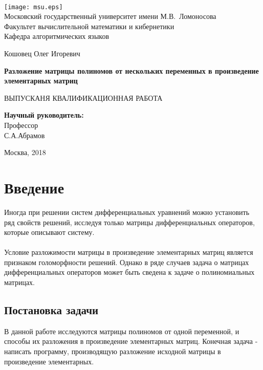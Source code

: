 \documentclass[14pt, a4paper]{extreport}
\begin{document}
\thispagestyle{empty}

\begin{center}
	\ \vspace{-3cm}

	\texttt{[image: msu.eps]}\\
	{Московский государственный университет имени М.В.~Ломоносова}\\
	Факультет вычислительной математики и кибернетики\\
	Кафедра алгоритмических языков

	\vspace{5cm}

	{\Large Кошовец Олег Игоревич}

	\vspace{1cm}

	{\Large\bfseries
	Разложение матрицы полиномов от нескольких переменных в произведение элементарных матриц\\}

	\vspace{1cm}

	{\large ВЫПУСКАНЯ КВАЛИФИКАЦИОННАЯ РАБОТА}
\end{center}

\vfill

\begin{flushright}
	\textbf{Научный руководитель:}\\
	Профессор\\
	С.А.Абрамов
\end{flushright}

\vfill


\begin{center}
	Москва, 2018
\end{center}
\newpage

\chapter{Введение}
	Иногда при решении систем дифференциальных уравнений можно установить ряд
	свойств решений, исследуя только матрицы дифференциальных операторов,
	которые описывают систему.
	\\\\
	Условие разложимости матрицы в произведение элементарных матриц является
	признаком голоморфности решений.
	Однако в ряде случаев задача о матрицах дифференциальных операторов
	может быть сведена к задаче о полиномиальных матрицах.
	\section{Постановка задачи}
	В данной работе исследуются матрицы полиномов от одной переменной,
	и способы их разложения в произведение элементарных матриц.
	Конечная задача - написать программу, производящую разложение
	исходной матрицы в произведение элементарных.
\newpage
\end{document}
